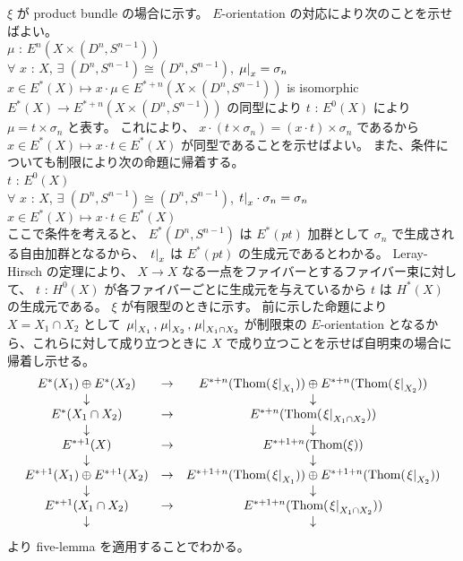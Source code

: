 \documentclass[dvipdfmx]{jsarticle}
\begin{document}
\begin{Proof}
\itemprof
  \(\xi\) が product bundle の場合に示す。
  \(E\)-orientation の対応により次のことを示せばよい。 \\
  \For \(\mu\) : \(E^{n}(X \times (D^{n}, S^{n-1}))\) \\
  \IfHold \(\forall\) \(x\) : \(X\), \(\exists\) \((D^{n}, S^{n-1}) \cong (D^{n}, S^{n-1})\), \(\left. {\mu} \right| _{x} = \sigma_{n}\) \\
  \Then \(x \in E^{*}(X) \mapsto x \cdot \mu \in E^{*+n}(X \times (D^{n}, S^{n-1}))\) is isomorphic \\
  \(E^{*}(X) \to E^{*+n}(X \times (D^{n}, S^{n-1}))\) の同型により \(t\) : \(E^0(X)\) により \(\mu = t \times \sigma_n\) と表す。
  これにより、 \(x \cdot (t \times \sigma_{n}) = (x \cdot t) \times \sigma_{n}\) であるから \(x \in E^{*}(X) \mapsto x \cdot t \in E^{*}(X)\) が同型であることを示せばよい。
  また、条件についても制限により次の命題に帰着する。 \\
  \For \(t\) : \(E^0(X)\) \\
  \IfHold \(\forall\) \(x\) : \(X\), \(\exists\) \((D^{n}, S^{n-1}) \cong (D^{n}, S^{n-1})\), \(\left. {t} \right| _{x} \cdot \sigma_{n} = \sigma_{n}\) \\
  \Then \(x \in E^{*}(X) \mapsto x \cdot t \in E^{*}(X)\) \\
  ここで条件を考えると、 \(E^{*}(D^{n}, S^{n-1})\) は \(E^{*}(pt)\) 加群として \(\sigma_{n}\) で生成される自由加群となるから、 \(\left. {t} \right| _{x}\) は \(E^{*}(pt)\) の生成元であるとわかる。
  Leray-Hirsch の定理により、 \(X \to X\) なる一点をファイバーとするファイバー束に対して、 \(t\) : \(H^0(X)\) が各ファイバーごとに生成元を与えているから \(t\) は \(H^*(X)\) の生成元である。
\itemprof
  \(\xi\) が有限型のときに示す。
  前に示した命題により \(X=X_1 \cap X_2\) として \(\left. {\mu} \right| _{X_1} , \left. {\mu} \right| _{X_2} , \left. {\mu} \right| _{X_1 \cap X_2}\) が制限束の \(E\)-orientation となるから、これらに対して成り立つときに \(X\) で成り立つことを示せば自明束の場合に帰着し示せる。
  \[\begin{matrix}
    E^{*}(X_1) \oplus E^{*}(X_2) & \to & E^{*+n}(\text{Thom}(\left. {\xi} \right| _{X_1})) \oplus E^{*+n}(\text{Thom}(\left. {\xi} \right| _{X_2})) \\
    \downarrow & & \downarrow \\
    E^{*}(X_1 \cap X_2) & \to & E^{*+n}(\text{Thom}(\left. {\xi} \right| _{X_1 \cap X_2})) \\
    \downarrow & & \downarrow \\
    E^{*+1}(X) & \to & E^{*+1+n}(\text{Thom}(\xi)) \\
    \downarrow & & \downarrow \\
    E^{*+1}(X_1) \oplus E^{*+1}(X_2) & \to & E^{*+1+n}(\text{Thom}(\left. {\xi} \right| _{X_1})) \oplus E^{*+1+n}(\text{Thom}(\left. {\xi} \right| _{X_2})) \\
    \downarrow & & \downarrow \\
    E^{*+1}(X_1 \cap X_2) & \to & E^{*+1+n}(\text{Thom}(\left. {\xi} \right| _{X_1 \cap X_2})) \\
    \downarrow & & \downarrow \\
  \end{matrix}\]
  より five-lemma を適用することでわかる。
\end{Proof}
\end{document}
